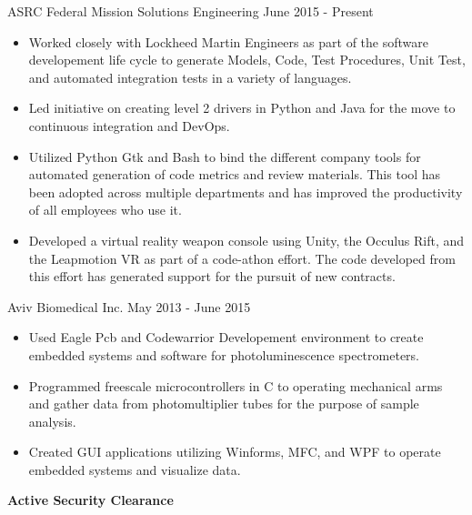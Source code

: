 \documentclass[11pt]{article}
\begin{document}
\newcommand{\NewJobTitle}[2]
{
  \begin{flushleft}
	#1
	\hfill #2 \hfill
  \end{flushleft}
}

\newcommand{\JobBullet}[1]
{
    \begin{itemize}
	\item #1
    \end{itemize}
}

\smallskip

\ExecutiveSummary
\bigskip

\Education
\bigskip

\NewJobTitle{ASRC Federal Mission Solutions Engineering}{June 2015 - Present}
\JobBullet{Worked closely with Lockheed Martin Engineers as part of the software developement life cycle to generate Models, Code, Test Procedures, Unit Test, and automated integration tests in a variety of languages.}
\JobBullet{Led initiative on creating level 2 drivers in Python and Java for the move to continuous integration and DevOps.}
\JobBullet{Utilized Python Gtk and Bash to bind the different company tools for automated generation of code metrics and review materials.  This tool has been adopted across multiple departments and has improved the productivity of all employees who use it.}
\JobBullet{Developed a virtual reality weapon console using Unity, the Occulus Rift, and the Leapmotion VR as part of a code-athon effort. The code developed from this effort has generated support for the pursuit of new contracts.}


\NewJobTitle{Aviv Biomedical Inc.}{May 2013 - June 2015}
\JobBullet{Used Eagle Pcb and Codewarrior Developement environment to create embedded systems and software for photoluminescence spectrometers.}
\JobBullet{Programmed freescale microcontrollers in C to operating mechanical arms and gather data from photomultiplier tubes for the purpose of sample analysis.}
\JobBullet{Created GUI applications utilizing Winforms, MFC, and WPF to operate embedded systems and visualize data.}

\centerline{\textbf{Active Security Clearance}}
\end{document}
